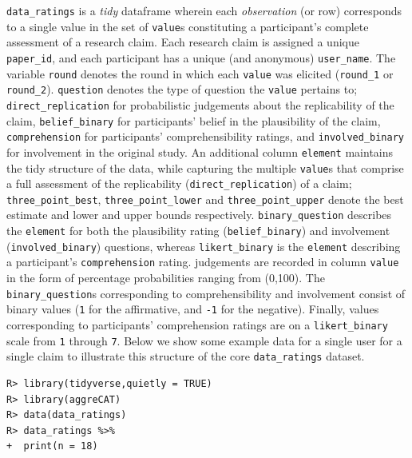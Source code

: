 \documentclass[article]{jss}
\begin{document}
\texttt{data\_ratings} is a \emph{tidy} dataframe wherein each
\emph{observation} (or row) corresponds to a single value in the set of
\texttt{value}s constituting a participant's complete assessment of a
research claim. Each research claim is assigned a unique
\texttt{paper\_id}, and each participant has a unique (and anonymous)
\texttt{user\_name}. The variable \texttt{round} denotes the round in
which each \texttt{value} was elicited (\texttt{round\_1} or
\texttt{round\_2}). \texttt{question} denotes the type of question the
\texttt{value} pertains to; \texttt{direct\_replication} for
probabilistic judgements about the replicability of the claim,
\texttt{belief\_binary} for participants' belief in the plausibility of
the claim, \texttt{comprehension} for participants' comprehensibility
ratings, and \texttt{involved\_binary} for involvement in the original
study. An additional column \texttt{element} maintains the tidy
structure of the data, while capturing the multiple \texttt{value}s that
comprise a full assessment of the replicability
(\texttt{direct\_replication}) of a claim; \texttt{three\_point\_best},
\texttt{three\_point\_lower} and \texttt{three\_point\_upper} denote the
best estimate and lower and upper bounds respectively.
\texttt{binary\_question} describes the \texttt{element} for both the
plausibility rating (\texttt{belief\_binary}) and involvement
(\texttt{involved\_binary}) questions, whereas \texttt{likert\_binary}
is the \texttt{element} describing a participant's
\texttt{comprehension} rating. judgements are recorded in column
\texttt{value} in the form of percentage probabilities ranging from
(0,100). The \texttt{binary\_question}s corresponding to
comprehensibility and involvement consist of binary values (\texttt{1}
for the affirmative, and \texttt{-1} for the negative). Finally, values
corresponding to participants' comprehension ratings are on a
\texttt{likert\_binary} scale from \texttt{1} through \texttt{7}. Below
we show some example data for a single user for a single claim to
illustrate this structure of the core \texttt{data\_ratings} dataset.

\begin{verbatim}
R> library(tidyverse,quietly = TRUE)
R> library(aggreCAT)
R> data(data_ratings)
R> data_ratings %>% 
+  print(n = 18)
\end{verbatim}
\end{document}
